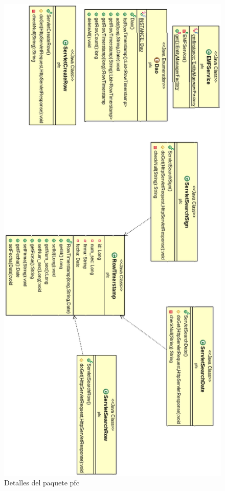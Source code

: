 \begin{figure}
  \centering
    \includegraphics[scale=0.6]{./GoogleAppEngine/imagenes/UML_pfc.png}
  \caption{Detalles del paquete pfc}
  \label{fig:paquete_pfc}
\end{figure}

